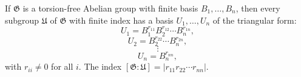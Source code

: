 If $\mathfrak{G}$ is a torsion-free Abelian group with finite basis $B_1, \ldots, B_n$, then every subgroup $\mathfrak{U}$ of $\mathfrak{G}$ with finite index has a basis $U_1, \ldots, U_n$ of the triangular form:
$$U_1 = B_1^{r_{11}} B_2^{r_{12}} \cdots B_n^{r_{1n}},$$
$$U_2 = B_2^{r_{22}} \cdots B_n^{r_{2n}},$$
$$\vdots$$
$$U_n = B_n^{r_{nn}},$$
with $r_{ii} \neq 0$ for all $i$. The index $[\mathfrak{G} : \mathfrak{U}] = |r_{11} r_{22} \cdots r_{nn}|$.
